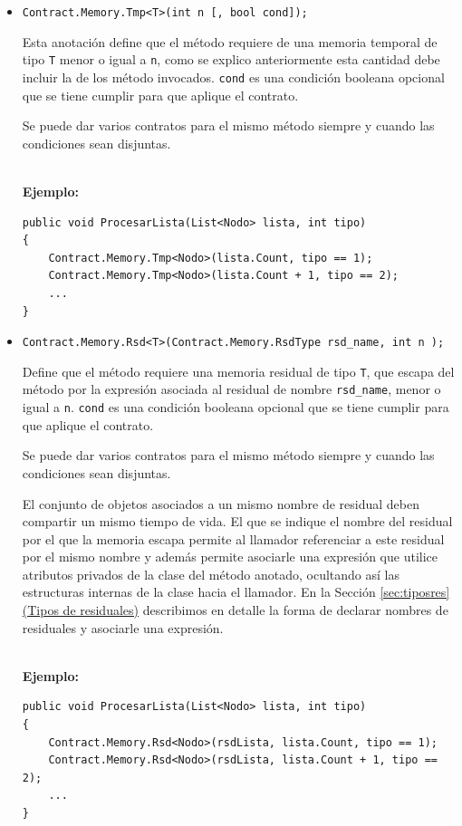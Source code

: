 \documentclass[12pt,a4paper]{article}
\newcommand\mono[1]{\texttt{#1}}
\begin{document}
			\begin{itemize}
				\item 
					\mono{Contract.Memory.Tmp<T>(int n [, bool cond]);}
					
					Esta anotación define que el método requiere de una memoria temporal de tipo \mono{T} menor o igual a \mono{n}, como se explico anteriormente esta cantidad debe incluir la de los método  invocados. \mono{cond} es una condición booleana opcional que se tiene cumplir para que aplique el contrato.

					Se puede dar varios contratos para el mismo método siempre y cuando las condiciones sean disjuntas.

					\noindent\\
					\textbf{Ejemplo:}
					\begin{footnotesize}
					\begin{lstlisting}[caption=Ejemplo de \mono{Contract.Memory.Tmp},numbers=none]
public void ProcesarLista(List<Nodo> lista, int tipo)
{
	Contract.Memory.Tmp<Nodo>(lista.Count, tipo == 1);
	Contract.Memory.Tmp<Nodo>(lista.Count + 1, tipo == 2);
	...
}
					\end{lstlisting}
					\end{footnotesize}
				\item
					\mono{Contract.Memory.Rsd<T>(Contract.Memory.RsdType rsd\_name, int n \newline [, bool cond]);}
					
					Define que el método requiere una memoria residual de tipo \mono{T}, que escapa del método por la expresión asociada al residual de nombre \mono{rsd\_name}, menor o igual a \mono{n}. \mono{cond} es una condición booleana opcional que se tiene cumplir para que aplique el contrato.

					Se puede dar varios contratos para el mismo método siempre y cuando las condiciones sean disjuntas.

					El conjunto de objetos asociados a un mismo nombre de residual deben compartir un mismo tiempo de vida. El que se indique el nombre del residual por el que la memoria escapa permite al llamador referenciar a este residual por el mismo nombre y además permite asociarle una expresión que utilice atributos privados de la clase del método anotado, ocultando así las estructuras internas de la clase hacia el llamador. En la Sección \hyperref[sec:tiposres]{\ref*{sec:tiposres} (Tipos de residuales)} describimos en detalle la forma de declarar nombres de residuales y asociarle una expresión.

					\noindent\\
					\textbf{Ejemplo:}
					\begin{footnotesize}
					\begin{lstlisting}[caption=Ejemplo de \mono{Contract.Memory.Rsd},numbers=none]
public void ProcesarLista(List<Nodo> lista, int tipo)
{
	Contract.Memory.Rsd<Nodo>(rsdLista, lista.Count, tipo == 1);
	Contract.Memory.Rsd<Nodo>(rsdLista, lista.Count + 1, tipo == 2);
	...
}
					\end{lstlisting}
					\end{footnotesize}
			\end{itemize}
\end{document}
